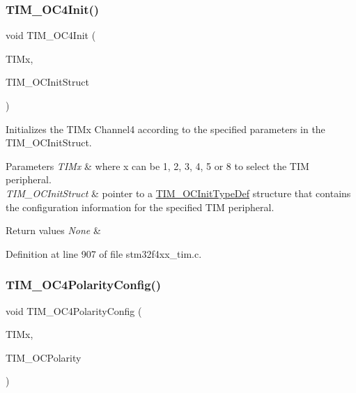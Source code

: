 \subsubsection{\texorpdfstring{T\+I\+M\+\_\+\+O\+C4\+Init()}{TIM\_OC4Init()}}
{\footnotesize\ttfamily void T\+I\+M\+\_\+\+O\+C4\+Init (\begin{DoxyParamCaption}\item[{\hyperlink{struct_t_i_m___type_def}{T\+I\+M\+\_\+\+Type\+Def} $\ast$}]{T\+I\+Mx,  }\item[{\hyperlink{struct_t_i_m___o_c_init_type_def}{T\+I\+M\+\_\+\+O\+C\+Init\+Type\+Def} $\ast$}]{T\+I\+M\+\_\+\+O\+C\+Init\+Struct }\end{DoxyParamCaption})}



Initializes the T\+I\+Mx Channel4 according to the specified parameters in the T\+I\+M\+\_\+\+O\+C\+Init\+Struct. 


\begin{DoxyParams}{Parameters}
{\em T\+I\+Mx} & where x can be 1, 2, 3, 4, 5 or 8 to select the T\+IM peripheral. \\
\hline
{\em T\+I\+M\+\_\+\+O\+C\+Init\+Struct} & pointer to a \hyperlink{struct_t_i_m___o_c_init_type_def}{T\+I\+M\+\_\+\+O\+C\+Init\+Type\+Def} structure that contains the configuration information for the specified T\+IM peripheral. \\
\hline
\end{DoxyParams}

\begin{DoxyRetVals}{Return values}
{\em None} & \\
\hline
\end{DoxyRetVals}


Definition at line 907 of file stm32f4xx\+\_\+tim.\+c.

\mbox{\label{group___t_i_m_gad678410f7c7244f83daad93ce9d1056e}} 
\subsubsection{\texorpdfstring{T\+I\+M\+\_\+\+O\+C4\+Polarity\+Config()}{TIM\_OC4PolarityConfig()}}
{\footnotesize\ttfamily void T\+I\+M\+\_\+\+O\+C4\+Polarity\+Config (\begin{DoxyParamCaption}\item[{\hyperlink{struct_t_i_m___type_def}{T\+I\+M\+\_\+\+Type\+Def} $\ast$}]{T\+I\+Mx,  }\item[{uint16\+\_\+t}]{T\+I\+M\+\_\+\+O\+C\+Polarity }\end{DoxyParamCaption})}




